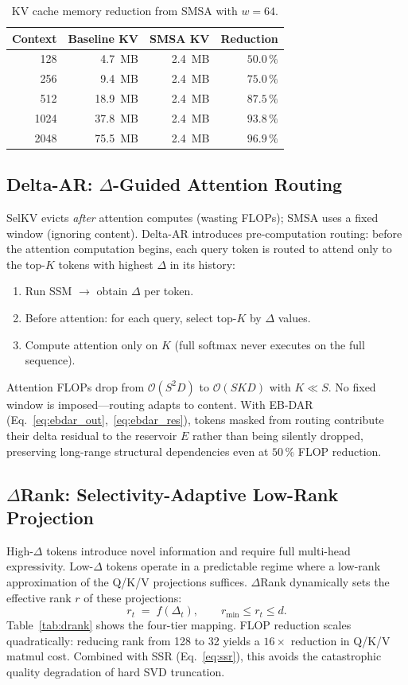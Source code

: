 \documentclass[11pt]{article}
\newcommand{\dsig}{\Delta}
\newcommand{\Order}{\mathcal{O}}
\begin{document}
\begin{table}[H]
\centering
\small
\caption{KV cache memory reduction from SMSA with $w{=}64$.}
\label{tab:smsa_mem}
\begin{tabular}{rrrr}
\toprule
Context & Baseline KV & SMSA KV & Reduction \\
\midrule
128   & 4.7~MB  & 2.4~MB & $50.0\,\%$ \\
256   & 9.4~MB  & 2.4~MB & $75.0\,\%$ \\
512   & 18.9~MB & 2.4~MB & $87.5\,\%$ \\
1024  & 37.8~MB & 2.4~MB & $93.8\,\%$ \\
2048  & 75.5~MB & 2.4~MB & $\mathbf{96.9\,\%}$ \\
\bottomrule
\end{tabular}
\end{table}

\subsection{Delta-AR: $\dsig$-Guided Attention Routing}
SelKV evicts \emph{after} attention computes (wasting FLOPs); SMSA uses a
fixed window (ignoring content). Delta-AR introduces pre-computation routing:
before the attention computation begins, each query token is routed to
attend only to the top-$K$ tokens with highest $\dsig$ in its history:
\begin{enumerate}[leftmargin=1.4em,itemsep=1pt,topsep=1pt]
  \item Run SSM $\rightarrow$ obtain $\dsig$ per token.
  \item Before attention: for each query, select top-$K$ by $\dsig$ values.
  \item Compute attention only on $K$ (full softmax never executes on the full sequence).
\end{enumerate}
Attention FLOPs drop from $\Order(S^2 D)$ to $\Order(SKD)$ with $K\!\ll\!S$.
No fixed window is imposed---routing adapts to content. With EB-DAR
(Eq.~\ref{eq:ebdar_out},~\ref{eq:ebdar_res}), tokens masked from routing
contribute their delta residual to the reservoir $E$ rather than being
silently dropped, preserving long-range structural dependencies even at
$50\,\%$ FLOP reduction.

\subsection{$\dsig$Rank: Selectivity-Adaptive Low-Rank Projection}
High-$\dsig$ tokens introduce novel information and require full multi-head
expressivity. Low-$\dsig$ tokens operate in a predictable regime where a
low-rank approximation of the Q/K/V projections suffices. $\dsig$Rank
dynamically sets the effective rank $r$ of these projections:
\begin{equation}\label{eq:drank}
  r_t \;=\; f(\dsig_t),\qquad r_{\min} \le r_t \le d.
\end{equation}
Table~\ref{tab:drank} shows the four-tier mapping. FLOP reduction scales
quadratically: reducing rank from 128 to 32 yields a $16\!\times$ reduction
in Q/K/V matmul cost. Combined with SSR (Eq.~\ref{eq:ssr}), this avoids the
catastrophic quality degradation of hard SVD truncation.
\end{document}
